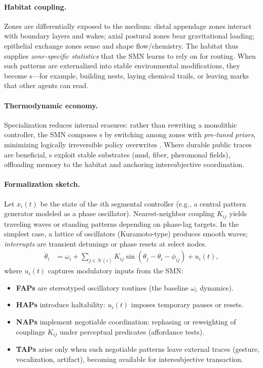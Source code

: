 \paragraph{Habitat coupling.}
Zones are differentially exposed to the medium: distal appendage zones interact with boundary layers and wakes; axial postural zones bear gravitational loading; epithelial exchange zones sense and shape flow/chemistry.
The habitat thus supplies \emph{zone-specific statistics} that the SMN learns to rely on for \NAP{} routing.
When such patterns are externalized into stable environmental modifications, they become \TAP{}s---for example, building nests, laying chemical trails, or leaving marks that other agents can read.

\paragraph{Thermodynamic economy.}
Specialization reduces internal erasures: rather than rewriting a monolithic controller, the SMN composes \NAP{}s by switching among zones with \emph{pre-tuned priors}, minimizing logically irreversible policy overwrites \cite{Landauer1961Irreversibility,Bennett2003LandauerNotes}.
Where durable public traces are beneficial, \TAP{}s exploit stable substrates (mud, fiber, pheromonal fields), offloading memory to the habitat and anchoring intersubjective coordination.
\paragraph{Formalization sketch.}
Let $x_i(t)$ be the state of the $i$th segmental controller (e.g., a central pattern generator modeled as a phase oscillator).
Nearest-neighbor coupling $K_{ij}$ yields traveling waves or standing patterns depending on phase-lag targets.
In the simplest case, a lattice of oscillators (Kuramoto-type) produces smooth waves; \emph{interrupts} are transient detunings or phase resets at select nodes.
\begin{align}
\dot{\theta}_i &= \omega_i + \sum_{j \in \mathcal{N}(i)} K_{ij} \sin(\theta_j - \theta_i - \phi_{ij}) + u_i(t),
\end{align}
where $u_i(t)$ captures modulatory inputs from the SMN:
\begin{itemize}
  \item \textbf{FAPs} are stereotyped oscillatory routines (the baseline $\omega_i$ dynamics).
  \item \textbf{HAPs} introduce haltability: $u_i(t)$ imposes temporary pauses or resets.
  \item \textbf{NAPs} implement negotiable coordination: rephasing or reweighting of couplings $K_{ij}$ under perceptual predicates (affordance tests).
  \item \textbf{TAPs} arise only when such negotiable patterns leave external traces (gesture, vocalization, artifact), becoming available for intersubjective transaction.
\end{itemize}

